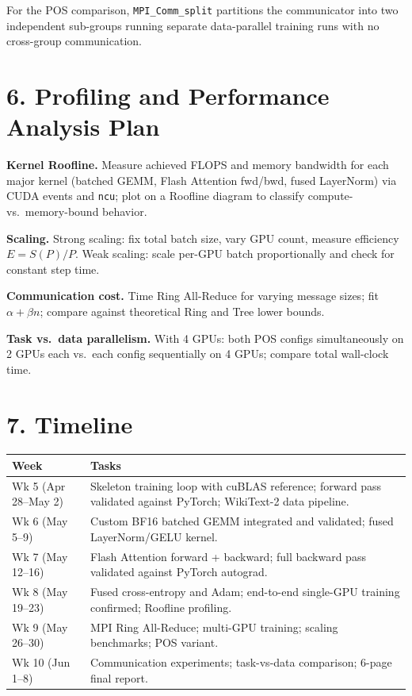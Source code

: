 \documentclass[11pt]{article}
\begin{document}
For the POS comparison, \texttt{MPI\_Comm\_split} partitions the communicator into two independent sub-groups running separate data-parallel training runs with no cross-group communication.

\section*{6. Profiling and Performance Analysis Plan}

\textbf{Kernel Roofline.} Measure achieved FLOPS and memory bandwidth for each major kernel (batched GEMM, Flash Attention fwd/bwd, fused LayerNorm) via CUDA events and \texttt{ncu}; plot on a Roofline diagram to classify compute- vs.\ memory-bound behavior.

\textbf{Scaling.} Strong scaling: fix total batch size, vary GPU count, measure efficiency $E = S(P)/P$. Weak scaling: scale per-GPU batch proportionally and check for constant step time.

\textbf{Communication cost.} Time Ring All-Reduce for varying message sizes; fit $\alpha + \beta n$; compare against theoretical Ring and Tree lower bounds.

\textbf{Task vs.\ data parallelism.} With 4 GPUs: both POS configs simultaneously on 2 GPUs each vs.\ each config sequentially on 4 GPUs; compare total wall-clock time.

\section*{7. Timeline}

\begin{center}
\begin{tabular}{@{}lp{10.5cm}@{}}
\toprule
\textbf{Week} & \textbf{Tasks} \\
\midrule
Wk 5 (Apr 28--May 2) & Skeleton training loop with cuBLAS reference; forward pass validated against PyTorch; WikiText-2 data pipeline. \\
Wk 6 (May 5--9)      & Custom BF16 batched GEMM integrated and validated; fused LayerNorm/GELU kernel. \\
Wk 7 (May 12--16)    & Flash Attention forward + backward; full backward pass validated against PyTorch autograd. \\
Wk 8 (May 19--23)    & Fused cross-entropy and Adam; end-to-end single-GPU training confirmed; Roofline profiling. \\
Wk 9 (May 26--30)    & MPI Ring All-Reduce; multi-GPU training; scaling benchmarks; POS variant. \\
Wk 10 (Jun 1--8)     & Communication experiments; task-vs-data comparison; 6-page final report. \\
\bottomrule
\end{tabular}
\end{center}
\end{document}
